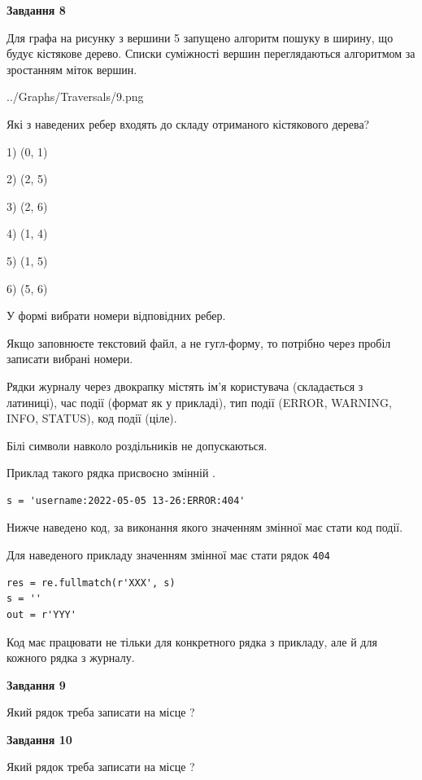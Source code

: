 \documentclass[12pt, ukrainian]{article}
\def\code#1{\Verb!#1!}
\begin{document}
{\begin {large}
{\begin {center}\textbf{Завдання 8}\end {center}}\par
Для графа на рисунку з вершини 5 запущено алгоритм пошуку в ширину, що будує кістякове дерево. Списки суміжності вершин переглядаються алгоритмом за зростанням міток вершин.\par
\begin{center}
	{../Graphs/Traversals/9.png}
\end{center}
\par Які з наведених ребер входять до складу отриманого кістякового дерева?\par
1) (0, 1)\par
2) (2, 5)\par
3) (2, 6)\par
4) (1, 4)\par
5) (1, 5)\par
6) (5, 6)\par
{\vskip 15pt} У формі вибрати номери відповідних ребер.


Якщо заповнюєте текстовий файл, а не гугл-форму, то потрібно через пробіл записа\-ти вибрані номери.\par
\newpage


Рядки журналу через двокрапку містять ім'я користувача (складається з латиниці), час події (фор\-мат як у прикладі), тип події (ERROR, WARNING, INFO, STATUS), код події (ціле).

Білі символи навколо роздільників не допускаються.

Приклад такого рядка присвоєно змінній .



\begin{verbatim}
s = 'username:2022-05-05 13-26:ERROR:404'
\end{verbatim}


Нижче наведено код, за виконання якого значенням змінної  має стати код події.

Для наведеного прикладу значенням змінної  має стати рядок \code{404}



\begin{verbatim}
res = re.fullmatch(r'XXX', s)
s = ''
out = r'YYY'
\end{verbatim}


Код має працювати не тільки для конкретного рядка з прикладу, але й для кожного рядка з журналу.

{\begin {center}\textbf{Завдання 9}\end {center}}\par
Який рядок треба записати на місце  ?\par
\vspace{5mm}


{\begin {center}\textbf{Завдання 10}\end {center}}\par
Який рядок треба записати на місце  ?\par


\newpage


\end {large}}
\end{document}

